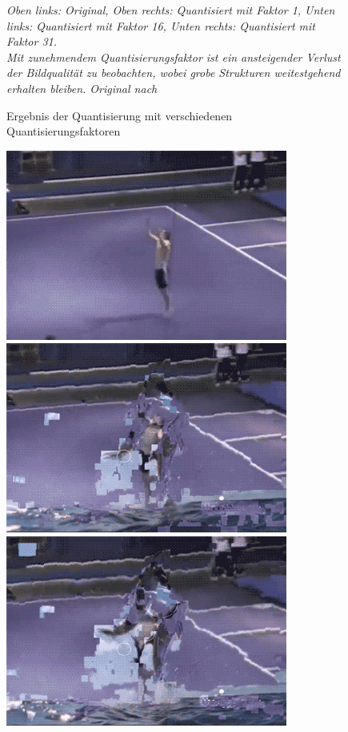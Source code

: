 \begin{figure}[h!]
    \caption{Ergebnis der Quantisierung mit verschiedenen Quantisierungsfaktoren}
    \textit{Oben links: Original, Oben rechts: Quantisiert mit Faktor 1, Unten links: Quantisiert mit Faktor 16, Unten rechts: Quantisiert mit Faktor 31.\\
    Mit zunehmendem Quantisierungsfaktor ist ein ansteigender Verlust der Bildqualität zu beobachten, wobei grobe Strukturen weitestgehend erhalten bleiben. Original nach \cite{brooke_cagle__2016}}
    \label{fig:quantization_multi_mquants}
\end{figure}




\begin{figure}[h!]
    \centering
    \includegraphics[scale=0.566]{images/corruptedGif/frame7.png}
    \includegraphics[scale=0.566]{images/corruptedGif/frame10.png}
    \includegraphics[scale=0.566]{images/corruptedGif/frame13.png}

\end{figure}
